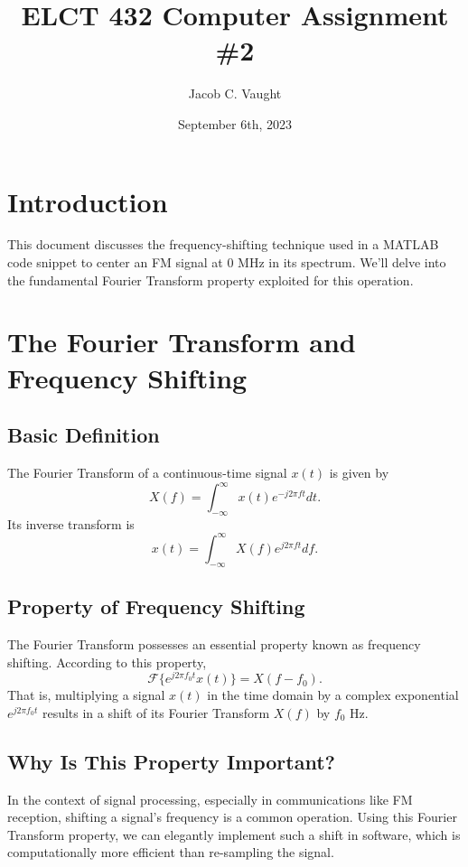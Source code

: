 \documentclass{article}
\begin{document}
\title{ELCT 432 Computer Assignment \#2}
\author{ Jacob C. Vaught}
\date{September 6th, 2023}
\maketitle

\section*{Introduction}

This document discusses the frequency-shifting technique used in a MATLAB code snippet to center an FM signal at 0 MHz in its spectrum. We'll delve into the fundamental Fourier Transform property exploited for this operation.

\section*{The Fourier Transform and Frequency Shifting}

\subsection*{Basic Definition}
The Fourier Transform of a continuous-time signal \( x(t) \) is given by
\[
X(f) = \int_{-\infty}^{\infty} x(t)e^{-j 2 \pi f t} dt.
\]
Its inverse transform is
\[
x(t) = \int_{-\infty}^{\infty} X(f)e^{j 2 \pi f t} df.
\]

\subsection*{Property of Frequency Shifting}

The Fourier Transform possesses an essential property known as frequency shifting. According to this property,
\[
\mathcal{F}\{ e^{j 2 \pi f_0 t} x(t) \} = X(f-f_0).
\]
That is, multiplying a signal \( x(t) \) in the time domain by a complex exponential \( e^{j 2 \pi f_0 t} \) results in a shift of its Fourier Transform \( X(f) \) by \( f_0 \) Hz.

\subsection*{Why Is This Property Important?}

In the context of signal processing, especially in communications like FM reception, shifting a signal's frequency is a common operation. Using this Fourier Transform property, we can elegantly implement such a shift in software, which is computationally more efficient than re-sampling the signal.
\end{document}
